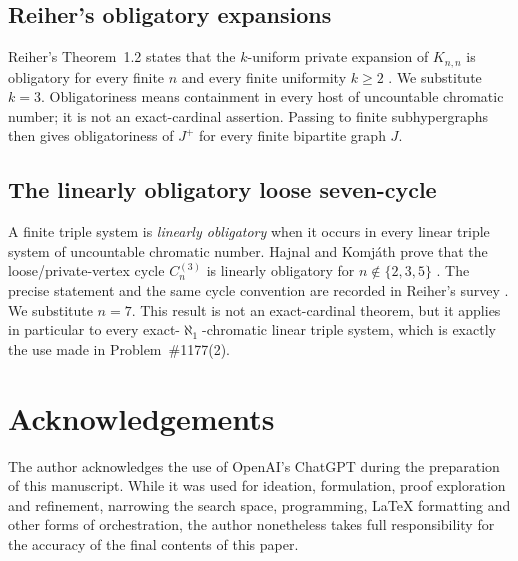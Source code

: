 \documentclass[11pt]{amsart}
\theoremstyle{definition}
\theoremstyle{remark}
\numberwithin{equation}{section}
\begin{document}
\subsection{Reiher's obligatory expansions}

Reiher's Theorem~1.2 states that the $k$-uniform private expansion of
$K_{n,n}$ is obligatory for every finite $n$ and every finite uniformity
$k\ge2$ \cite[Theorem~1.2]{ReiherObligatory}.  We substitute $k=3$.
Obligatoriness means containment in every host of uncountable chromatic
number; it is not an exact-cardinal assertion.  Passing to finite
subhypergraphs then gives obligatoriness of $J^+$ for every finite
bipartite graph $J$.

\subsection{The linearly obligatory loose seven-cycle}

A finite triple system is \emph{linearly obligatory} when it occurs in
every linear triple system of uncountable chromatic number.  Hajnal and
Komj\'ath prove that the loose/private-vertex cycle $C_n^{(3)}$ is linearly
obligatory for $n\notin\{2,3,5\}$ \cite{HK2008}.  The precise statement
and the same cycle convention are recorded in Reiher's survey
\cite[\S3.7, p.~43]{ReiherGirth}.  We substitute $n=7$.  This result is
not an exact-cardinal theorem, but it applies in particular to every
exact-$\aleph_1$-chromatic linear triple system, which is exactly the use
made in Problem~\#1177(2).

\section*{Acknowledgements}

The author acknowledges the use of OpenAI's ChatGPT during the
preparation of this manuscript.  While it was used for ideation,
formulation, proof exploration and refinement, narrowing the search
space, programming, LaTeX formatting and other forms of orchestration,
the author nonetheless takes full responsibility for the accuracy of the
final contents of this paper.
\end{document}

